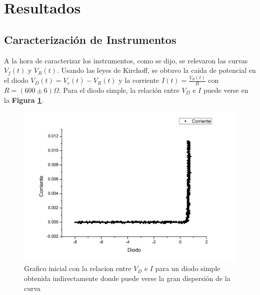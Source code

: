 \documentclass[11pt,a4paper]{article}
\begin{document}

\section{Resultados}
\label{sec:discusion}

\subsection{Caracterización de Instrumentos}

A la hora de caracterizar los instrumentos, como se dijo, se relevaron las curvas $V_f(t)$ y $V_R(t)$. Usando las leyes de Kirchoff, se obtuvo la caida de potencial en el diodo $V_D(t) = V_e(t)-V_R(t)$ y la corriente $I(t) = \frac{V_R(t)}{R}$ con $R = (600 \pm 6)\Omega$. Para el diodo simple, la relación entre $V_D$ e $I$ puede verse en la \textbf{Figura \ref{fig:simple_feo}}.

\begin{figure}[H]
\centering
\includegraphics[scale=0.5]{simple_feo}
   \caption{Grafico inicial con la relacion entre $V_D$ e $I$ para un diodo simple obtenida indirectamente donde puede verse la gran dispersión de la curva}
   \label{fig:simple_feo}
\end{figure}
\end{document}
